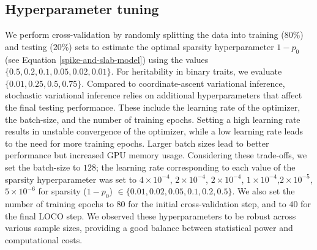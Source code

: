 \subsection{Hyperparameter tuning}
We perform cross-validation by randomly splitting the data into training ($80\%$) and testing ($20\%$) sets to estimate the optimal sparsity hyperparameter $1-p_0$ (see Equation \ref{spike-and-slab-model}) using the values $\{0.5, 0.2, 0.1, 0.05, 0.02, 0.01\}$.
%
For heritability in binary traits, we evaluate $\{0.01, 0.25, 0.5, 0.75 \}$.
%
Compared to coordinate-ascent variational inference, stochastic variational inference relies on additional hyperparameters that affect the final testing performance.
%
These include the learning rate of the optimizer, the batch-size, and the number of training epochs.
%
Setting a high learning rate results in unstable convergence of the optimizer, while a low learning rate leads to the need for more training epochs.
%
Larger batch sizes lead to better performance but increased GPU memory usage.
%
Considering these trade-offs, we set the batch-size to $128$; the learning rate corresponding to each value of the sparsity hyperparameter was set to $4 \times 10^{-4}$, $2 \times 10^{-4}$, $2 \times 10^{-4}$, $1 \times 10^{-4}$,$2 \times 10^{-5}$, $5 \times 10^{-6}$ for sparsity ($1-p_0$) $ \in \{0.01, 0.02, 0.05, 0.1, 0.2, 0.5\}$.
%
We also set the number of training epochs to $80$ for the initial cross-validation step, and to $40$ for the final LOCO step.
%
We observed these hyperparameters to be robust across various sample sizes, providing a good balance between statistical power and computational costs. 

\newpage

